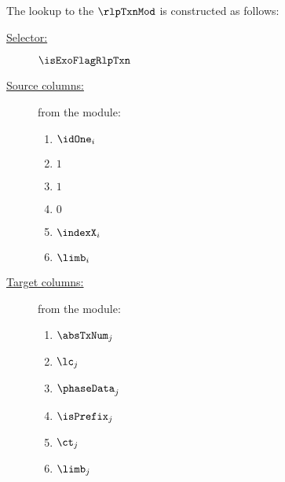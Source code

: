 The lookup to the $\rlpTxnMod$ is constructed as follows:
\begin{description}
	\item[\underline{Selector:}] $\isExoFlagRlpTxn$
	\item[\underline{Source columns:}] from the \mmioMod{} module:
		\begin{multicols}{3}
			\begin{enumerate}
				\item $\idOne_{i}$
				\item $1$
				\item $1$
				\item $0$
				\item $\indexX_{i}$
				\item $\limb_{i}$
			\end{enumerate}
		\end{multicols}
	\item[\underline{Target columns:}] from the \rlpTxnMod{} module: 
		\begin{multicols}{3}
			\begin{enumerate}
				\item $\absTxNum_{j}$
				\item $\lc_{j}$
				\item $\phaseData_{j}$
				\item $\isPrefix_{j}$
				\item $\ct_{j}$
				\item $\limb_{j}$
			\end{enumerate}
		\end{multicols}
\end{description}